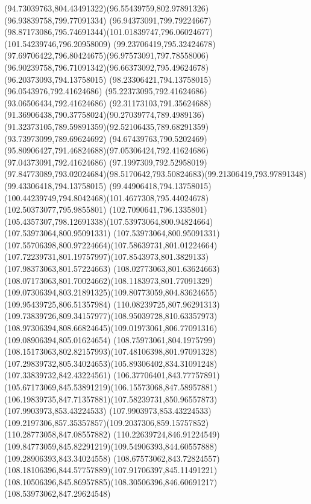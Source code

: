 {{		\curveto(94.73039763,804.43491322)(96.55439759,802.97891326)(96.93839758,799.77091334)
		\lineto(96.94373091,799.79224667)
		\curveto(98.87173086,795.74691344)(101.01839747,796.06024677)(101.54239746,796.20958009)
		\curveto(99.23706419,795.32424678)(97.69706422,796.80424675)(96.97573091,797.78558006)
		\curveto(96.90239758,796.71091342)(96.66373092,795.49624678)(96.20373093,794.13758015)
		\lineto(98.23306421,794.13758015)
		\lineto(96.0543976,792.41624686)
		\lineto(95.22373095,792.41624686)
		\lineto(93.06506434,792.41624686)
		\curveto(92.31173103,791.35624688)(91.36906438,790.37758024)(90.27039774,789.4989136)
		\curveto(91.32373105,789.59891359)(92.52106435,789.68291359)(93.73973099,789.69624692)
		\curveto(94.67439763,790.5202469)(95.80906427,791.46824688)(97.05306424,792.41624686)
		\lineto(97.04373091,792.41624686)
		\lineto(97.1997309,792.52958019)
		\curveto(97.84773089,793.02024684)(98.5170642,793.50824683)(99.21306419,793.97891348)
		\lineto(99.43306418,794.13758015)
		\lineto(99.44906418,794.13758015)
		\curveto(100.44239749,794.8042468)(101.4677308,795.44024678)(102.50373077,795.9855801)
		\curveto(102.7090641,796.1335801)(105.4357307,798.12691338)(107.53973064,800.94824664)
		\lineto(107.53973064,800.95091331)
		\curveto(107.53973064,800.95091331)(107.55706398,800.97224664)(107.58639731,801.01224664)
		\curveto(107.72239731,801.19757997)(107.8543973,801.3829133)(107.98373063,801.57224663)
		\curveto(108.02773063,801.63624663)(108.07173063,801.70024662)(108.1183973,801.77091329)
		\curveto(109.07306394,803.21891325)(109.80773059,804.83624655)(109.95439725,806.51357984)
		\curveto(110.08239725,807.96291313)(109.73839726,809.34157977)(108.95039728,810.63357973)
		\curveto(108.97306394,808.66824645)(109.01973061,806.77091316)(109.08906394,805.01624654)
		\curveto(108.75973061,804.1975799)(108.15173063,802.82157993)(107.48106398,801.97091328)
		\curveto(107.29839732,805.34024653)(105.89306402,834.31091248)(107.33839732,842.43224561)
		\curveto(106.37706401,843.77757891)(105.67173069,845.53891219)(106.15573068,847.58957881)
		\curveto(106.19839735,847.71357881)(107.58239731,850.96557873)(107.9903973,853.43224533)
		\curveto(107.9903973,853.43224533)(109.2197306,857.35357857)(109.2037306,859.15757852)
		\lineto(110.28773058,847.08557882)
		\lineto(110.22639724,846.91224549)
		\curveto(109.84773059,845.82291219)(109.54906393,844.60557888)(109.28906393,843.34024558)
		\curveto(108.67573062,843.72824557)(108.18106396,844.57757889)(107.91706397,845.11491221)
		\curveto(108.10506396,845.86957885)(108.30506396,846.60691217)(108.53973062,847.29624548)
}}
